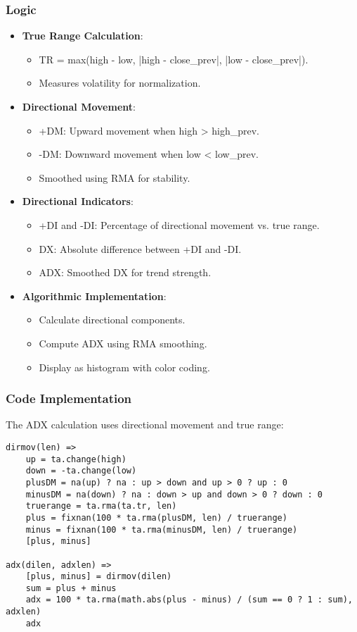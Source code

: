 \documentclass[12pt]{article}
\begin{document}
\subsubsection{Logic}
\begin{itemize}
\item \textbf{True Range Calculation}:
  \begin{itemize}
  \item TR = max(high - low, |high - close\_prev|, |low - close\_prev|).
  \item Measures volatility for normalization.
  \end{itemize}
\item \textbf{Directional Movement}:
  \begin{itemize}
  \item +DM: Upward movement when high > high\_prev.
  \item -DM: Downward movement when low < low\_prev.
  \item Smoothed using RMA for stability.
  \end{itemize}
\item \textbf{Directional Indicators}:
  \begin{itemize}
  \item +DI and -DI: Percentage of directional movement vs. true range.
  \item DX: Absolute difference between +DI and -DI.
  \item ADX: Smoothed DX for trend strength.
  \end{itemize}
\item \textbf{Algorithmic Implementation}:
  \begin{itemize}
  \item Calculate directional components.
  \item Compute ADX using RMA smoothing.
  \item Display as histogram with color coding.
  \end{itemize}
\end{itemize}

\subsubsection{Code Implementation}
The ADX calculation uses directional movement and true range:

\begin{lstlisting}[language=Pine, caption=Pine Script Code for ADX Calculation]
dirmov(len) =>
    up = ta.change(high)
    down = -ta.change(low)
    plusDM = na(up) ? na : up > down and up > 0 ? up : 0
    minusDM = na(down) ? na : down > up and down > 0 ? down : 0
    truerange = ta.rma(ta.tr, len)
    plus = fixnan(100 * ta.rma(plusDM, len) / truerange)
    minus = fixnan(100 * ta.rma(minusDM, len) / truerange)
    [plus, minus]

adx(dilen, adxlen) =>
    [plus, minus] = dirmov(dilen)
    sum = plus + minus
    adx = 100 * ta.rma(math.abs(plus - minus) / (sum == 0 ? 1 : sum), adxlen)
    adx
\end{lstlisting}
\end{document}
